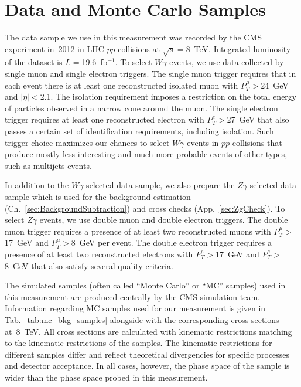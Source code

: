 \section{Data and Monte Carlo Samples}
\label{sec:DataAndMC}

The data sample we use in this measurement was recorded by the CMS experiment in~2012 in LHC $pp$ collisions at $\sqrt{s}=$8~TeV. Integrated luminosity of the dataset is $L=$19.6~fb$^{-1}$. To select $W\gamma$ events, we use data collected by single muon and single electron triggers. The single muon trigger requires that in each event there is at least one reconstructed isolated muon with $P_T^{\mu}>$24~GeV and $|\eta|<$2.1. The isolation requirement imposes a restriction on the total energy of particles observed in a narrow cone around the muon. The single electron trigger requires at least one reconstructed electron with $P_T^{e}>$27~GeV that also passes a certain set of identification requirements, including isolation. Such trigger choice maximizes our chances to select $W\gamma$ events in $pp$ collisions that produce mostly less interesting and much more probable events of other types, such as multijets events.

In addition to the $W\gamma$-selected data sample, we also prepare the $Z\gamma$-selected data sample which is used for the background estimation (Ch.~\ref{sec:BackgroundSubtraction}) and cross checks (App.~\ref{sec:ZgCheck}). To select $Z\gamma$ events, we use double muon and double electron triggers. The double muon trigger requires a presence of at least two reconstructed muons with $P_T^{\mu}>$17~GeV and $P_T^{\mu}>$8~GeV per event. The double electron trigger requires a presence of at least two reconstructed electrons with $P_T^{e}>$17~GeV and $P_T^{e}>$8~GeV that also satisfy several quality criteria.

The simulated samples (often called ``Monte Carlo'' or ``MC'' samples) used in this measurement are produced centrally by the CMS simulation team. Information regarding MC samples used for our measurement is given in Tab.~\ref{tab:mc_bkg_samples} alongside with the corresponding cross sections at~8~TeV. All cross sections are calculated with kinematic restrictions matching to the kinematic restrictions of the samples. The kinematic restrictions for different samples differ and reflect theoretical divergencies for specific processes and detector acceptance. In all cases, however, the phase space of the sample is wider than the phase space probed in this measurement.

